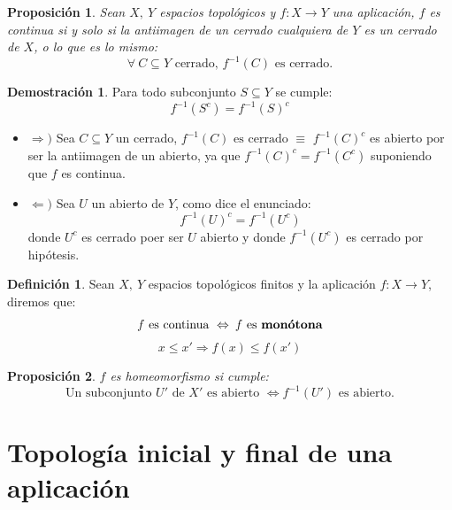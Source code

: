 \documentclass[12pt,twoside]{report}
\theoremstyle{azul}
\theoremstyle{azul2}
\theoremstyle{plain}
\newtheorem*{prop}{Proposición}
\theoremstyle{definition}
\newtheorem*{defi}{Definición}
\newtheorem*{dem}{Demostración}
\theoremstyle{remark}
\begin{document}
\begin{prop}
Sean $X,\: Y$ espacios topológicos y $f: X \longrightarrow Y$ una aplicación, $f$ es continua si y solo si la antiimagen de un cerrado cualquiera de $Y$ es un cerrado de $X$, o lo que es lo mismo:
$$\forall \: C \subseteq Y \text{ cerrado, } f^{-1}(C) \text{ es cerrado.}$$
\end{prop}
\begin{dem}
Para todo subconjunto $S \subseteq Y$ se cumple: 
$$f^{-1}(S^c)=f^{-1}(S)^c$$
\begin{itemize}
    \item $\Rightarrow )$  Sea $ C \subseteq Y$ un cerrado,  $f^{-1}(C) \text{ es cerrado }\equiv$ $f^{-1}(C)^c$ es abierto por ser la antiimagen de un abierto, ya que $f^{-1}(C)^c=f^{-1}(C^c)$ suponiendo que $f$ es continua.
\item$\Leftarrow )$ Sea $U$ un abierto de $Y$, como dice el enunciado:
$$f^{-1}(U)^c = f^{-1}(U^c)$$
\hspace{5mm} donde $U^c$ es cerrado poer ser $U$ abierto y donde $f^{-1}(U^c)$ es cerrado por hipótesis. 
\end{itemize}
\end{dem}

\begin{defi}
Sean $X, \: Y $ espacios topológicos finitos y
la aplicación $f: X \longrightarrow Y$, diremos que:
$$f \text{ es continua } \Leftrightarrow \: f \text{ es \textbf{mon{\'otona}}}$$
\vspace{-10mm}$$x\leq x' \Rightarrow f(x) \leq f(x')$$
\end{defi}
\begin{prop}
$f$ es homeomorfismo si cumple: 
$$\text{Un subconjunto } U' \text{ de } X' \text{ es abierto } \iff f^{-1}(U') \text{ es abierto.}$$
\end{prop}
\newpage
\section{Topología inicial y final de una aplicación} 
\end{document}
